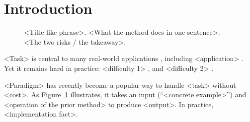 \section{Introduction} \label{sec:introduction}

\begin{figure}[t]
    \centering
    \vspace{-8pt}
    \caption{<Title-like phrase>. <What the method does in one sentence>. <The two risks / the takeaway>.}
    \label{fig:teaser-figure}
    \vspace{-12pt}
\end{figure}

<Task> is central to many real-world applications \citep{Placeholder-A, Placeholder-B}, including <application> \citep{Placeholder-C}.
Yet it remains hard in practice: <difficulty 1> \citep{Placeholder-A}, and <difficulty 2> \citep{Placeholder-B}.

<Paradigm> \citep{Placeholder-A} has recently become a popular way to handle <task> without <cost>.
As Figure~\ref{fig:teaser-figure} illustrates, it takes an input (\eg ``<concrete example>'') and <operation of the prior method> to produce <output>.
In practice, <implementation fact>.

